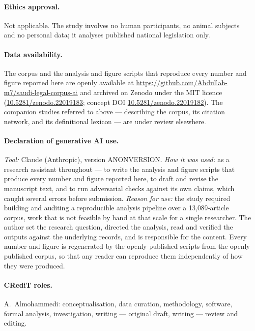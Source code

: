 \documentclass[11pt]{article}
\begin{document}
\paragraph{Ethics approval.} Not applicable. The study involves no human
participants, no animal subjects and no personal data; it analyses published
national legislation only.

\paragraph{Data availability.} The corpus and the analysis and figure scripts
that reproduce every number and figure reported here are openly available at
\url{https://github.com/Abdullah-m7/saudi-legal-corpus-ai} and archived on
Zenodo under the MIT licence
(\href{https://doi.org/10.5281/zenodo.22019183}{10.5281/zenodo.22019183};
concept DOI
\href{https://doi.org/10.5281/zenodo.22019182}{10.5281/zenodo.22019182}).
The companion studies referred to above --- describing the corpus, its
citation network, and its definitional lexicon --- are under review elsewhere.

\paragraph{Declaration of generative AI use.} \emph{Tool:} Claude
(Anthropic), version ANONVERSION. \emph{How it was used:} as a research
assistant throughout --- to write the analysis and figure scripts that produce
every number and figure reported here, to draft and revise the manuscript
text, and to run adversarial checks against its own claims, which caught
several errors before submission. \emph{Reason for use:} the study required
building and auditing a reproducible analysis pipeline over a 13,089-article
corpus, work that is not feasible by hand at that scale for a single
researcher. The author set the research question, directed the analysis, read
and verified the outputs against the underlying records, and is responsible
for the content. Every number and figure is regenerated by the openly
published scripts from the openly published corpus, so that any reader can
reproduce them independently of how they were produced.

\paragraph{CRediT roles.} A.~Almohammedi: conceptualisation, data curation,
methodology, software, formal analysis, investigation, writing --- original
draft, writing --- review and editing.
\end{document}
